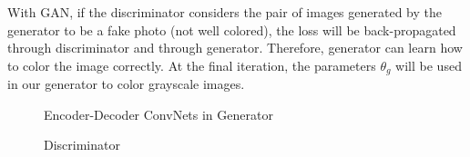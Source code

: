 \documentclass[oneside,a4paper,12pt]{report}
\begin{document}
	With GAN, if the discriminator considers the pair of images generated by the generator to be a fake photo (not well colored), the loss will be back-propagated through discriminator and through generator. Therefore, generator can learn how to color the image correctly. At the final iteration, the parameters $\theta_g$ will be used in our generator to color grayscale images.

  \begin{center}
	\begin{figure}[!htbp]
		\centering
	  \caption{Encoder-Decoder ConvNets in Generator}
	  \label{fig:gen_color-dig}
	\end{figure}
\end{center}

  \begin{center}
	\begin{figure}[!htbp]
		\centering
	  \caption{Discriminator}
	  \label{fig:disc_color-dig}
	\end{figure}
  \end{center}
\end{document}
